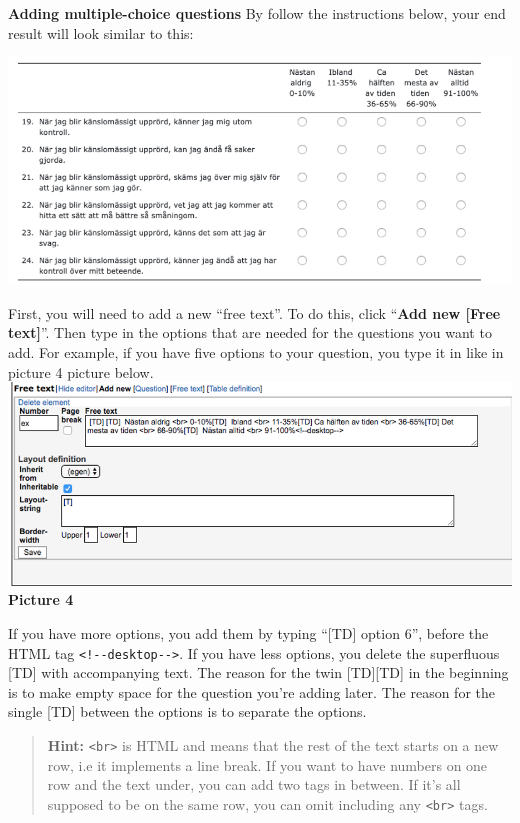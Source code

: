 \documentclass[
]{book}
\begin{document}
\textbf{Adding multiple-choice questions}
By follow the instructions below, your end result will look similar to this:

\includegraphics{images/new-images/multiplechoiceQ.png}

First, you will need to add a new ``free text''. To do this, click ``\textbf{Add new {[}Free text{]}}''. Then type in the options that are needed for the questions you want to add. For example, if you have five options to your question, you type it in like in picture 4 picture below.
\includegraphics{images/new-images/multiplechoiceFreeText.png}
\textbf{Picture 4}

If you have more options, you add them by typing ``{[}TD{]} option 6'', before the HTML tag \texttt{\textless{}!-\/-desktop-\/-\textgreater{}}. If you have less options, you delete the superfluous {[}TD{]} with accompanying text. The reason for the twin {[}TD{]}{[}TD{]} in the beginning is to make empty space for the question you're adding later. The reason for the single {[}TD{]} between the options is to separate the options.

\begin{quote}
\textbf{Hint:} \texttt{\textless{}br\textgreater{}} is HTML and means that the rest of the text starts on a new row, i.e it implements a line break. If you want to have numbers on one row and the text under, you can add two tags in between. If it's all supposed to be on the same row, you can omit including any \texttt{\textless{}br\textgreater{}} tags.
\end{quote}
\end{document}

